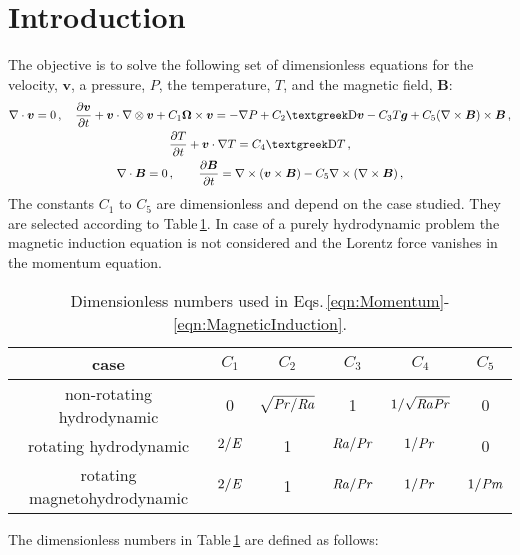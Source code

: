 \section{Introduction}
The objective is to solve the following set of dimensionless equations for the velocity, $\bm{v}$, a pressure, $P$, the temperature, $T$, and the magnetic field, $\bm{B}$:
\begin{gather}
	\nabla\cdot\bm{v}=0\,,\quad
	\pd{\bm{v}}{t}+\bm{v}\cdot\nabla\otimes\bm{v}+C_1\bm{\Omega}\times\bm{v}=-\nabla P+C_2\laplace\bm{v}-C_3T\bm{g}+C_5(\nabla\times\bm{B})\times\bm{B}\,,\label{eqn:Momentum}\\
	\pd{T}{t}+\bm{v}\cdot\nabla T=C_4\laplace T\,,\label{eqn:Energy}\\
	\nabla\cdot\bm{B}=0\,,\qquad
	\pd{\bm{B}}{t}=\nabla\times(\bm{v}\times\bm{B})-C_5\nabla\times(\nabla\times\bm{B})\,,\label{eqn:MagneticInduction}
\end{gather}
The constants $C_1$ to $C_5$ are dimensionless and depend on the case studied. They are selected according to Table\,\ref{tbl:Dimensionless}. In case of a purely hydrodynamic problem the magnetic induction equation is not considered and the Lorentz force vanishes in the momentum equation.
\begin{table}[!htb]
	\centering
	\caption{Dimensionless numbers used in Eqs.\,\eqref{eqn:Momentum}-\eqref{eqn:MagneticInduction}.\label{tbl:Dimensionless}}
	\begin{tabular}{cccccc}
		\toprule
		case & $C_1$ & $C_2$ & $C_3$ & $C_4$ & $C_5$ \\\midrule
		non-rotating hydrodynamic & 0 & $\sqrt{\mathit{Pr}/\mathit{Ra}}$ & 1 & $1/\sqrt{\mathit{Ra}\mathit{Pr}}$ & 0\\
		rotating hydrodynamic & $2/\mathit{E}$ & 1 & $\mathit{Ra}/\mathit{Pr}$ & $1/\mathit{Pr}$ & 0\\
		rotating magnetohydrodynamic & $2/\mathit{E}$ & 1 & $\mathit{Ra}/\mathit{Pr}$ & $1/\mathit{Pr}$ & $1/\mathit{Pm}$\\
		\bottomrule
	\end{tabular}
\end{table}
The dimensionless numbers in Table\,\ref{tbl:Dimensionless} are defined as follows:
